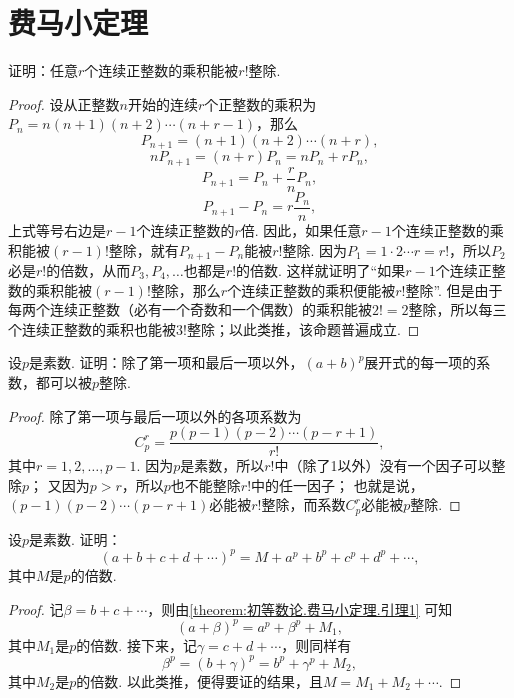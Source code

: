 \section{费马小定理}
\begin{lemma}\label{theorem:初等数论.费马小定理.引理0}
证明：任意\(r\)个连续正整数的乘积能被\(r!\)整除.
\begin{proof}
设从正整数\(n\)开始的连续\(r\)个正整数的乘积为\(P_n = n(n+1)(n+2)\dotsm(n+r-1)\)，那么\[
P_{n+1} = (n+1)(n+2)\dotsm(n+r),
\]\[
n P_{n+1} = (n+r) P_n = n P_n + r P_n,
\]\[
P_{n+1} = P_n + \frac{r}{n} P_n,
\]\[
P_{n+1} - P_n = r \frac{P_n}{n},
\]上式等号右边是\(r-1\)个连续正整数的\(r\)倍.
因此，如果任意\(r-1\)个连续正整数的乘积能被\((r-1)!\)整除，就有\(P_{n+1} - P_n\)能被\(r!\)整除.
因为\(P_1 = 1 \cdot 2 \dotsm r = r!\)，所以\(P_2\)必是\(r!\)的倍数，从而\(P_3,P_4,\dotsc\)也都是\(r!\)的倍数.
这样就证明了“如果\(r-1\)个连续正整数的乘积能被\((r-1)!\)整除，那么\(r\)个连续正整数的乘积便能被\(r!\)整除”.
但是由于每两个连续正整数（必有一个奇数和一个偶数）的乘积能被\(2!=2\)整除，所以每三个连续正整数的乘积也能被\(3!\)整除；以此类推，该命题普遍成立.
\end{proof}
\end{lemma}

\begin{lemma}\label{theorem:初等数论.费马小定理.引理1}
设\(p\)是素数.
证明：除了第一项和最后一项以外，\((a+b)^p\)展开式的每一项的系数，都可以被\(p\)整除.
\begin{proof}
除了第一项与最后一项以外的各项系数为\[
C_p^r = \frac{p(p-1)(p-2)\dotsm(p-r+1)}{r!},
\]其中\(r=1,2,\dotsc,p-1\).
因为\(p\)是素数，所以\(r!\)中（除了1以外）没有一个因子可以整除\(p\)；
又因为\(p>r\)，所以\(p\)也不能整除\(r!\)中的任一因子；
也就是说，\((p-1)(p-2)\dotsm(p-r+1)\)必能被\(r!\)整除，而系数\(C_p^r\)必能被\(p\)整除.
\end{proof}
\end{lemma}

\begin{lemma}\label{theorem:初等数论.费马小定理.引理2}
设\(p\)是素数.
证明：\[
(a+b+c+d+\dotsb)^p = M + a^p + b^p + c^p + d^p + \dotsb,
\]其中\(M\)是\(p\)的倍数.
\begin{proof}
记\(\beta=b+c+\dotsb\)，则由\cref{theorem:初等数论.费马小定理.引理1} 可知\[
(a+\beta)^p = a^p + \beta^p + M_1,
\]其中\(M_1\)是\(p\)的倍数.
接下来，记\(\gamma=c+d+\dotsb\)，则同样有\[
\beta^p = (b+\gamma)^p = b^p + \gamma^p + M_2,
\]其中\(M_2\)是\(p\)的倍数.
以此类推，便得要证的结果，且\(M = M_1+M_2+\dotsb\).
\end{proof}
\end{lemma}

